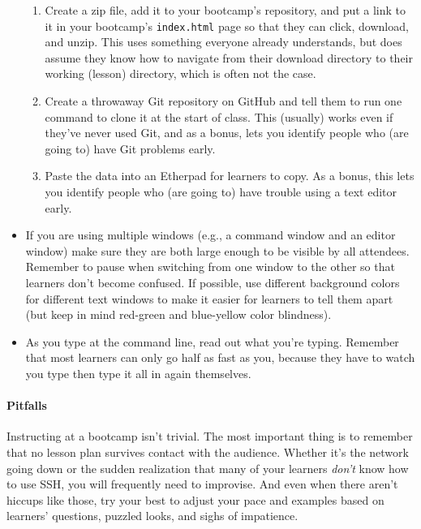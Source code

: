 \documentclass[]{book}
\begin{document}
\begin{itemize}
  \begin{enumerate}
  \item
    Create a zip file, add it to your bootcamp's repository, and put a
    link to it in your bootcamp's \texttt{index.html} page so that they
    can click, download, and unzip. This uses something everyone already
    understands, but does assume they know how to navigate from their
    download directory to their working (lesson) directory, which is
    often not the case.
  \item
    Create a throwaway Git repository on GitHub and tell them to run one
    command to clone it at the start of class. This (usually) works even
    if they've never used Git, and as a bonus, lets you identify people
    who (are going to) have Git problems early.
  \item
    Paste the data into an Etherpad for learners to copy. As a bonus,
    this lets you identify people who (are going to) have trouble using
    a text editor early.
  \end{enumerate}
\item
  If you are using multiple windows (e.g., a command window and an
  editor window) make sure they are both large enough to be visible by
  all attendees. Remember to pause when switching from one window to the
  other so that learners don't become confused. If possible, use
  different background colors for different text windows to make it
  easier for learners to tell them apart (but keep in mind red-green and
  blue-yellow color blindness).
\item
  As you type at the command line, read out what you're typing. Remember
  that most learners can only go half as fast as you, because they have
  to watch you type then type it all in again themselves.
\end{itemize}

\mbox{}\paragraph{Pitfalls}

Instructing at a bootcamp isn't trivial. The most important thing is to
remember that no lesson plan survives contact with the audience. Whether
it's the network going down or the sudden realization that many of your
learners \emph{don't} know how to use SSH, you will frequently need to
improvise. And even when there aren't hiccups like those, try your best
to adjust your pace and examples based on learners' questions, puzzled
looks, and sighs of impatience.
\end{document}
